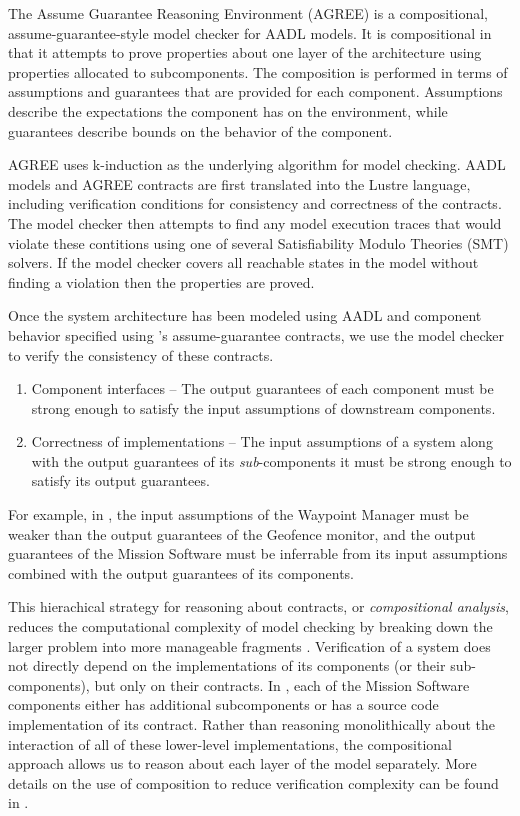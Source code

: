 
The Assume Guarantee Reasoning Environment (AGREE) is a compositional, assume-guarantee-style model
checker for AADL models. It is compositional in that it attempts to prove properties about one layer
of the architecture using properties allocated to subcomponents. The composition is performed in
terms of assumptions and guarantees that are provided for each component. Assumptions describe the
expectations the component has on the environment, while guarantees describe bounds on the behavior
of the component. 

AGREE uses k-induction as the underlying algorithm for model checking.  AADL models and AGREE
contracts are first translated into the Lustre language, including verification conditions for consistency
and correctness of the contracts.  The model checker then attempts to find any model execution traces
that would violate these contitions using one of several Satisfiability Modulo Theories (SMT) solvers. 
If the model checker covers all reachable states in the model without finding a violation then the properties are proved. 

Once the system architecture has been modeled using AADL
and component behavior specified using \agree's assume-guarantee contracts,
we use the \agree model checker to verify the consistency of these contracts.

\begin{enumerate}
\item Component interfaces -- The output guarantees of each component must be strong enough to
satisfy the input assumptions of downstream components. 
\item Correctness of implementations -- The input assumptions of a system along with the 
output guarantees of its \emph{sub}-components it must be strong enough to satisfy its output guarantees.
\end{enumerate}

For example, in ,
the input assumptions of the Waypoint Manager must be weaker than
the output guarantees of the Geofence monitor, 
and the output guarantees of the Mission Software must be inferrable from
its input assumptions combined with the output guarantees of its components.

This hierachical strategy for reasoning about contracts,
or \emph{compositional analysis},
reduces the computational complexity of model checking
by breaking down the larger problem into more manageable fragments \cite{compositional-analysis-agree}.
Verification of a system does not directly depend on the implementations of its components (or their sub-components),
but only on their contracts.  
In , each of the Mission Software components either has additional subcomponents 
or has a source code implementation of its contract.  
Rather than reasoning monolithically about the interaction of all of these lower-level implementations, 
the compositional approach allows us to reason about each layer of the model separately.  
More details on the use of composition to reduce verification complexity can be found in \cite{case-models-2021}.
